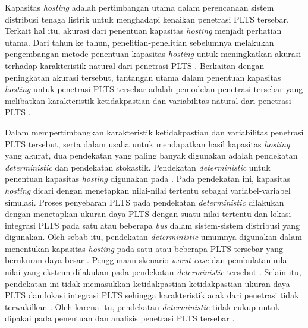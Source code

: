 Kapasitas \textit{hosting} adalah pertimbangan utama dalam perencanaan sistem distribusi tenaga listrik untuk menghadapi kenaikan penetrasi PLTS tersebar\cite{dubey_estimation_2017,electric_power_research_institute_stochastic_2012}. Terkait hal itu, akurasi dari penentuan kapasitas \textit{hosting} menjadi perhatian utama. Dari tahun ke tahun, penelitian-penelitian sebelumnya melakukan pengembangan metode penentuan kapasitas \textit{hosting} untuk meningkatkan akurasi terhadap karakteristik natural dari penetrasi PLTS \cite{breker_capacity_2015,kolenc_assessment_2015,dubey_estimation_2017,electric_power_research_institute_stochastic_2012,bollen_hosting_2017}. Berkaitan dengan peningkatan akurasi tersebut, tantangan utama dalam penentuan kapasitas \textit{hosting} untuk penetrasi PLTS tersebar adalah pemodelan penetrasi tersebar yang melibatkan karakteristik ketidakpastian dan variabilitas natural dari penetrasi PLTS \cite{heslop_maximum_2016,luthander_large-scale_2017,emmanuel_impact_2017,breker_capacity_2015,kolenc_assessment_2015,bollen_hosting_2017,dubey_estimation_2017,electric_power_research_institute_stochastic_2012}.

Dalam mempertimbangkan karakteristik ketidakpastian dan variabilitas penetrasi PLTS tersebut, serta dalam usaha untuk mendapatkan hasil kapasitas \textit{hosting} yang akurat, dua pendekatan yang paling banyak digunakan adalah pendekatan \textit{deterministic} dan pendekatan stokastik. Pendekatan \textit{deterministic} untuk penentuan kapasitas \textit{hosting} digunakan pada \cite{conti_probabilistic_2007,shayani_photovoltaic_2011,kabir_probabilistic_2016,heslop_maximum_2016,luthander_large-scale_2017,emmanuel_impact_2017,abdelkader_new_2020}. Pada pendekatan ini, kapasitas \textit{hosting} dicari dengan menetapkan nilai-nilai tertentu sebagai variabel-variabel simulasi. Proses penyebaran PLTS pada pendekatan \textit{deterministic} dilakukan dengan menetapkan ukuran daya PLTS dengan suatu nilai tertentu dan lokasi integrasi PLTS pada satu atau beberapa \textit{bus} dalam sistem-sistem distribusi yang digunakan. Oleh sebab itu, pendekatan \textit{deterministic} umumnya digunakan dalam menentukan kapasitas \textit{hosting} pada satu atau beberapa PLTS tersebar yang berukuran daya besar \cite{wang_analytical_2004,gozel_analytical_2009}. Penggunaan skenario \textit{worst-case} dan pembulatan nilai-nilai yang ekstrim dilakukan pada pendekatan \textit{deterministic} tersebut \cite{mokryani_deterministic_2017}. Selain itu, pendekatan ini tidak memasukkan ketidakpastian-ketidakpastian ukuran daya PLTS dan lokasi integrasi PLTS sehingga karakteristik acak dari penetrasi tidak terwakilkan \cite{conti_probabilistic_2007,kabir_probabilistic_2016}. Oleh karena itu, pendekatan \textit{deterministic} tidak cukup untuk dipakai pada penentuan dan analisis penetrasi PLTS tersebar \cite{zubo_operation_2017}. 

